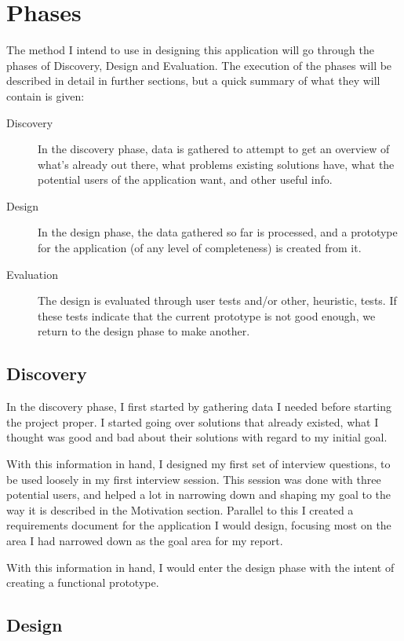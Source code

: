 \documentclass[]{report}
\begin{document}
\section{Phases}

The method I intend to use in designing this application will go through the
phases of Discovery, Design and Evaluation. The execution of the phases will be
described in detail in further sections, but a quick summary of what they will
contain is given:

\begin{description}
\item[Discovery] In the discovery phase, data is gathered to attempt to get an
  overview of what's already out there, what problems existing solutions have,
  what the potential users of the application want, and other useful info.
\item[Design] In the design phase, the data gathered so far is processed, and a
  prototype for the application (of any level of completeness) is created from
  it.
\item[Evaluation] The design is evaluated through user tests and/or other,
  heuristic, tests. If these tests indicate that the current prototype is not
  good enough, we return to the design phase to make another.
\end{description}

\subsection{Discovery}

In the discovery phase, I first started by gathering data I needed before
starting the project proper. I started going over solutions that already
existed, what I thought was good and bad about their solutions with regard to my
initial goal.

With this information in hand, I designed my first set of interview questions,
to be used loosely in my first interview session. This session was done with
three potential users, and helped a lot in narrowing down and shaping my goal
to the way it is described in the Motivation section. Parallel to this I created
a requirements document for the application I would design, focusing most on the
area I had narrowed down as the goal area for my report.

With this information in hand, I would enter the design phase with the intent of
creating a functional prototype.

\subsection{Design}
\end{document}
